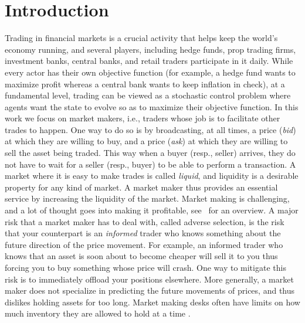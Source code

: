\documentclass[final,12pt]{colt2025}
\begin{document}
\section{Introduction}
Trading in financial markets is a crucial activity that helps keep the world's economy running, and several players, including hedge funds, prop trading firms, investment banks, central banks, and retail traders participate in it daily. While every actor has their own objective function (for example, a hedge fund wants to maximize profit whereas a central bank wants to keep inflation in check), at a fundamental level, trading can be viewed as a stochastic control problem where agents want the state to evolve so as to maximize their objective function.
In this work we focus on market makers, i.e., traders whose job is to facilitate other trades to happen.
One way to do so is by broadcasting, at all times, a price (\emph{bid}) at which they are willing to buy, and a price (\emph{ask}) at which they are willing to sell the asset being traded.
This way when a buyer (resp., seller) arrives, they do not have to wait for a seller (resp., buyer) to be able to perform a transaction.
A market where it is easy to make trades is called \emph{liquid}, and liquidity is a desirable property for any kind of market. A market maker thus provides an essential service by increasing the liquidity of the market. %
%
Market making is challenging, and a lot of thought goes into making it profitable, see~\citet{harris2003trading} for an overview. A major risk that a market maker has to deal with, called adverse selection, is the risk that your counterpart is an \emph{informed} trader who knows something about the future direction of the price movement. 
For example, an informed trader who knows that an asset is soon about to become cheaper will sell it to you thus forcing you to buy something whose price will crash. 
One way to mitigate this risk is to immediately offload your positions elsewhere. More generally, a market maker does not specialize in predicting the future movements of prices, and thus dislikes holding assets for too long. Market making desks often have limits on how much inventory they are allowed to hold at a time \citep{fender2015early}.

\end{document}
